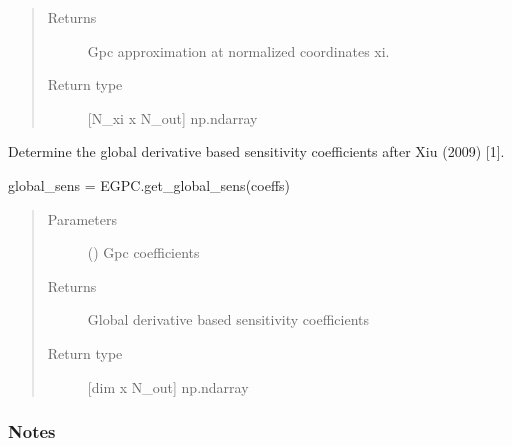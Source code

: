 \documentclass[letterpaper,10pt,english,openany,oneside]{sphinxmanual}
\begin{document}
\begin{fulllineitems}
\begin{fulllineitems}
\begin{quote}
\begin{description}
\begin{itemize}
\end{itemize}

\item[{Returns}] \leavevmode
{} \textendash{} Gpc approximation at normalized coordinates xi.

\item[{Return type}] \leavevmode
{[}N\_xi x N\_out{]} np.ndarray

\end{description}\end{quote}

\end{fulllineitems}


\begin{fulllineitems}
\label{\detokenize{pygpc:pygpc.EGPC.EGPC.get_global_sens}}
Determine the global derivative based sensitivity coefficients after Xiu (2009) {[}1{]}.

global\_sens = EGPC.get\_global\_sens(coeffs)
\begin{quote}\begin{description}
\item[{Parameters}] \leavevmode
{} (\sphinxstyleliteralemphasis{\sphinxupquote{{[}}}\sphinxstyleliteralemphasis{\sphinxupquote{{]} }}) \textendash{} Gpc coefficients

\item[{Returns}] \leavevmode
{} \textendash{} Global derivative based sensitivity coefficients

\item[{Return type}] \leavevmode
{[}dim x N\_out{]} np.ndarray

\end{description}\end{quote}
\subsubsection*{Notes}

\end{fulllineitems}



\end{fulllineitems}
\end{document}
